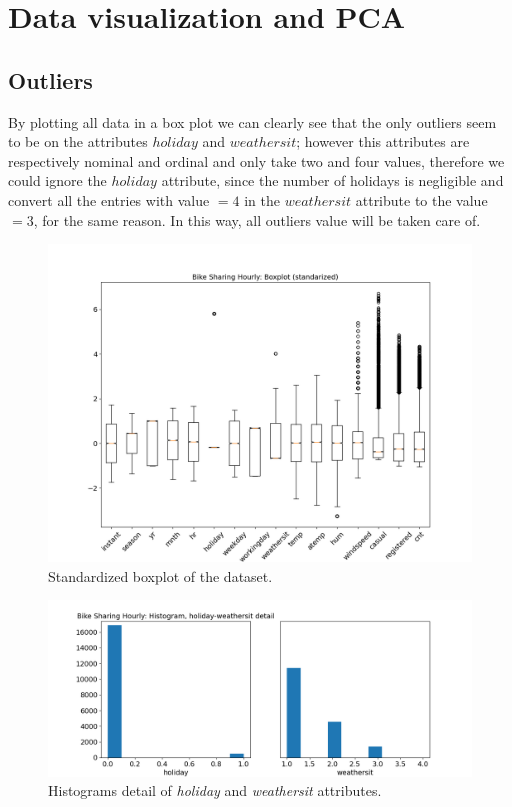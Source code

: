 \documentclass[11pt,a4paper]{article}
\begin{document}
\section{Data visualization and PCA}

\subsection{Outliers}

By plotting all data in a box plot we can clearly see that the only outliers seem to be on the attributes $holiday$ and $weathersit$; however this attributes are respectively nominal and ordinal and only take two and four values, therefore we could ignore the $holiday$ attribute, since the number of holidays is negligible and convert all the entries with value $= 4$ in the $weathersit$ attribute to the value $= 3$, for the same reason. In this way, all outliers value will be taken care of.

\begin{figure}[H]
    \centering
    \includegraphics[width=\linewidth]{res/plots/boxplot_standardized.png}
    \caption{Standardized boxplot of the dataset.}
    \label{fig:boxplot}
\end{figure}




\begin{figure}[H]
    \centering
    \includegraphics[width=0.7\linewidth]{res/plots/hist_outliers.png}
    \caption{Histograms detail of \textit{holiday} and \textit{weathersit} attributes.}
    \label{fig:hist_detail}
\end{figure}
\end{document}

